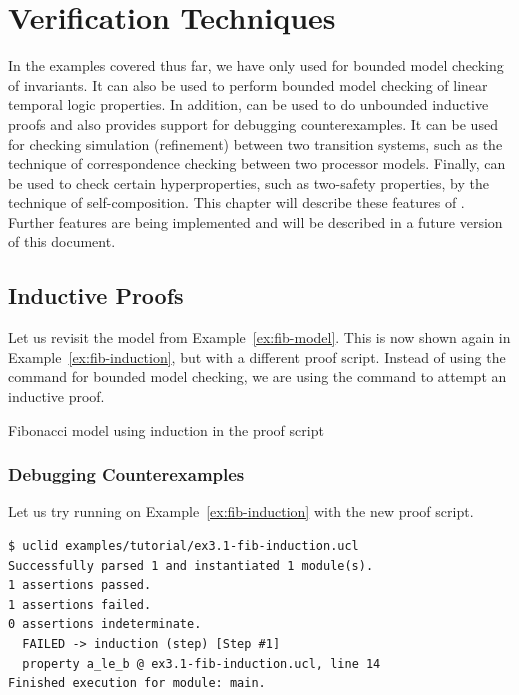 \chapter{Verification Techniques}
\label{ch:verif}

In the examples covered thus far, we have only used \uclid{} for bounded model checking of invariants. 
It can also be used to perform bounded model checking of linear temporal
logic properties.
In addition,
\uclid{} can be used to do unbounded inductive proofs and also provides support for debugging counterexamples. 
It can be used for checking simulation (refinement) between two transition systems,
such as the technique of correspondence checking between two
processor models.
Finally, \uclid{} can be used to check certain hyperproperties,
such as two-safety properties, by the technique of self-composition.
This chapter will describe these features of \uclid{}. Further features are being implemented and will be described in a future version of this document.

\section{Inductive Proofs} %

Let us revisit the model from Example~\ref{ex:fib-model}. This is now shown again in Example~\ref{ex:fib-induction}, but with a different proof script. Instead of using the  command for bounded model checking, we are using the  command to attempt an inductive proof.

\begin{uclidlisting}[htbp]
    
    \label{ex:fib-induction}
    \caption{\uclid{} Fibonacci model using induction in the proof script}
\end{uclidlisting}

\subsection{Debugging Counterexamples}

Let us try running \uclid{} on Example~\ref{ex:fib-induction} with the new proof script.
\begin{Verbatim}[frame=single, samepage=true]
$ uclid examples/tutorial/ex3.1-fib-induction.ucl 
Successfully parsed 1 and instantiated 1 module(s).
1 assertions passed.
1 assertions failed.
0 assertions indeterminate.
  FAILED -> induction (step) [Step #1] 
  property a_le_b @ ex3.1-fib-induction.ucl, line 14
Finished execution for module: main.
\end{Verbatim}

